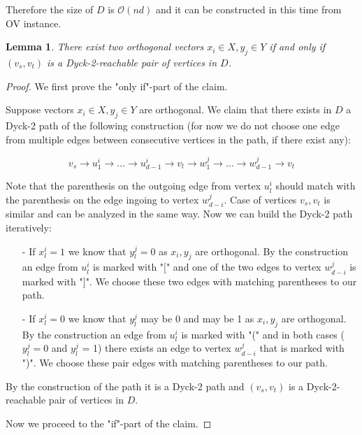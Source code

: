 \documentclass[12pt]{article}
\newtheorem{lemma}{Lemma}[section]
\begin{document}
Therefore the size of $D$ is $\mathcal{O}(nd)$ and it can be constructed in this time from OV instance.

\begin{lemma}
There exist two orthogonal vectors $x_i \in X, y_j \in Y$ if and only if $(v_s, v_t)$ is a Dyck-2-reachable pair of vertices in $D$.
\end{lemma}

\begin{proof}
We first prove the "only if"-part of the claim.

Suppose vectors $x_i \in X, y_j \in Y$ are orthogonal. We claim that there exists in $D$ a Dyck-2 path of the following construction (for now we do not choose one edge from multiple edges between consecutive vertices in the path, if there exist any):

\begin{equation}
v_s \rightarrow u^i_1 \rightarrow \ldots \rightarrow u^i_{d-1} \rightarrow v_l \rightarrow w^j_1 \rightarrow \ldots \rightarrow w^j_{d-1} \rightarrow v_t
\label{eq:path_constr}
\end{equation}

Note that the parenthesis on the outgoing edge from vertex $u^i_l$ should match with the parenthesis on the edge ingoing to vertex $w^j_{d-i}$. Case of vertices $v_s, v_t$ is similar and can be analyzed in the same way. Now we can build the Dyck-2 path iteratively: 

\begin{itemize}
    \item[-] If $x^i_l = 1$ we know that $y^j_l = 0$ as $x_i, y_j$ are orthogonal. By the construction an edge from $u^i_l$ is marked with "[" and one of the two edges to vertex $w^j_{d-i}$ is marked with "]". We choose these two edges with matching parentheses to our path.
    
    \item[-] If $x^i_l = 0$ we know that $y^j_l$ may be 0 and may be 1 as $x_i, y_j$ are orthogonal. By the construction an edge from $u^i_l$ is marked with "(" and in both cases ($y^j_l = 0$ and $y^j_l$ = 1) there exists an edge to vertex $w^j_{d-i}$ that is marked with ")". We choose these pair edges with matching parentheses to our path.
\end{itemize}

By the construction of the path it is a Dyck-2 path and $(v_s, v_t)$ is a Dyck-2-reachable pair of vertices in $D$.

Now we proceed to the "if"-part of the claim.


\end{proof}
\end{document}

